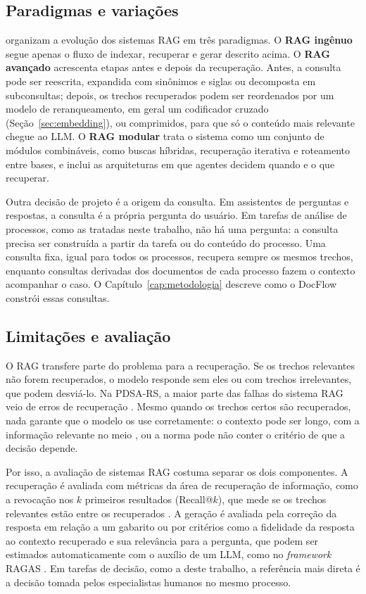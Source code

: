 \subsection{Paradigmas e variações}

 organizam a evolução dos sistemas RAG em três paradigmas. O \textbf{RAG ingênuo} segue apenas o fluxo de indexar, recuperar e gerar descrito acima. O \textbf{RAG avançado} acrescenta etapas antes e depois da recuperação. Antes, a consulta pode ser reescrita, expandida com sinônimos e siglas ou decomposta em subconsultas; depois, os trechos recuperados podem ser reordenados por um modelo de reranqueamento, em geral um codificador cruzado (Seção~\ref{sec:embedding}), ou comprimidos, para que só o conteúdo mais relevante chegue ao LLM. O \textbf{RAG modular} trata o sistema como um conjunto de módulos combináveis, como buscas híbridas, recuperação iterativa e roteamento entre bases, e inclui as arquiteturas em que agentes decidem quando e o que recuperar.

Outra decisão de projeto é a origem da consulta. Em assistentes de perguntas e respostas, a consulta é a própria pergunta do usuário. Em tarefas de análise de processos, como as tratadas neste trabalho, não há uma pergunta: a consulta precisa ser construída a partir da tarefa ou do conteúdo do processo. Uma consulta fixa, igual para todos os processos, recupera sempre os mesmos trechos, enquanto consultas derivadas dos documentos de cada processo fazem o contexto acompanhar o caso. O Capítulo~\ref{cap:metodologia} descreve como o DocFlow constrói essas consultas.

\subsection{Limitações e avaliação}

O RAG transfere parte do problema para a recuperação. Se os trechos relevantes não forem recuperados, o modelo responde sem eles ou com trechos irrelevantes, que podem desviá-lo. Na PDSA-RS, a maior parte das falhas do sistema RAG veio de erros de recuperação \cite{Montero2025}. Mesmo quando os trechos certos são recuperados, nada garante que o modelo os use corretamente: o contexto pode ser longo, com a informação relevante no meio \cite{Liu2024}, ou a norma pode não conter o critério de que a decisão depende.

Por isso, a avaliação de sistemas RAG costuma separar os dois componentes. A recuperação é avaliada com métricas da área de recuperação de informação, como a revocação nos $k$ primeiros resultados (Recall@$k$), que mede se os trechos relevantes estão entre os recuperados \cite{Manning2008}. A geração é avaliada pela correção da resposta em relação a um gabarito ou por critérios como a fidelidade da resposta ao contexto recuperado e sua relevância para a pergunta, que podem ser estimados automaticamente com o auxílio de um LLM, como no \textit{framework} RAGAS \cite{Es2024}. Em tarefas de decisão, como a deste trabalho, a referência mais direta é a decisão tomada pelos especialistas humanos no mesmo processo.

